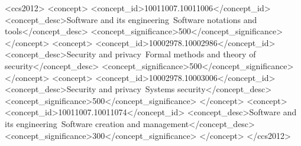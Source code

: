 \begin{abstract}
\end{abstract}

\begin{CCSXML}
<ccs2012>
   <concept>
       <concept_id>10011007.10011006</concept_id>
       <concept_desc>Software and its engineering~Software notations and tools</concept_desc>
       <concept_significance>500</concept_significance>
       </concept>
   <concept>
       <concept_id>10002978.10002986</concept_id>
       <concept_desc>Security and privacy~Formal methods and theory of security</concept_desc>
       <concept_significance>500</concept_significance>
       </concept>
   <concept>
       <concept_id>10002978.10003006</concept_id>
       <concept_desc>Security and privacy~Systems security</concept_desc>
       <concept_significance>500</concept_significance>
       </concept>
   <concept>
       <concept_id>10011007.10011074</concept_id>
       <concept_desc>Software and its engineering~Software creation and management</concept_desc>
       <concept_significance>300</concept_significance>
       </concept>
 </ccs2012>
\end{CCSXML}

